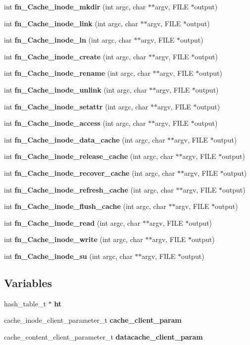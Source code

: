\begin{CompactItemize}
\item 
int {\bf fn\_\-Cache\_\-inode\_\-mkdir} (int argc, char $\ast$$\ast$argv, FILE $\ast$output)
\item 
int {\bf fn\_\-Cache\_\-inode\_\-link} (int argc, char $\ast$$\ast$argv, FILE $\ast$output)
\item 
int {\bf fn\_\-Cache\_\-inode\_\-ln} (int argc, char $\ast$$\ast$argv, FILE $\ast$output)
\item 
int {\bf fn\_\-Cache\_\-inode\_\-create} (int argc, char $\ast$$\ast$argv, FILE $\ast$output)
\item 
int {\bf fn\_\-Cache\_\-inode\_\-rename} (int argc, char $\ast$$\ast$argv, FILE $\ast$output)
\item 
int {\bf fn\_\-Cache\_\-inode\_\-unlink} (int argc, char $\ast$$\ast$argv, FILE $\ast$output)
\item 
int {\bf fn\_\-Cache\_\-inode\_\-setattr} (int argc, char $\ast$$\ast$argv, FILE $\ast$output)
\item 
int {\bf fn\_\-Cache\_\-inode\_\-access} (int argc, char $\ast$$\ast$argv, FILE $\ast$output)
\item 
int {\bf fn\_\-Cache\_\-inode\_\-data\_\-cache} (int argc, char $\ast$$\ast$argv, FILE $\ast$output)
\item 
int {\bf fn\_\-Cache\_\-inode\_\-release\_\-cache} (int argc, char $\ast$$\ast$argv, FILE $\ast$output)
\item 
int {\bf fn\_\-Cache\_\-inode\_\-recover\_\-cache} (int argc, char $\ast$$\ast$argv, FILE $\ast$output)
\item 
int {\bf fn\_\-Cache\_\-inode\_\-refresh\_\-cache} (int argc, char $\ast$$\ast$argv, FILE $\ast$output)
\item 
int {\bf fn\_\-Cache\_\-inode\_\-flush\_\-cache} (int argc, char $\ast$$\ast$argv, FILE $\ast$output)
\item 
int {\bf fn\_\-Cache\_\-inode\_\-read} (int argc, char $\ast$$\ast$argv, FILE $\ast$output)
\item 
int {\bf fn\_\-Cache\_\-inode\_\-write} (int argc, char $\ast$$\ast$argv, FILE $\ast$output)
\item 
int {\bf fn\_\-Cache\_\-inode\_\-su} (int argc, char $\ast$$\ast$argv, FILE $\ast$output)
\end{CompactItemize}
\subsection*{Variables}
\begin{CompactItemize}
\item 
hash\_\-table\_\-t $\ast$ {\bf ht}
\item 
cache\_\-inode\_\-client\_\-parameter\_\-t {\bf cache\_\-client\_\-param}
\item 
cache\_\-content\_\-client\_\-parameter\_\-t {\bf datacache\_\-client\_\-param}
\end{CompactItemize}


